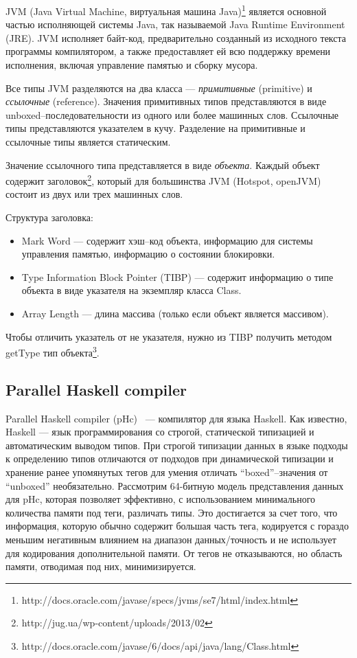 JVM (Java Virtual Machine, виртуальная машина Java)\footnote{http://docs.oracle.com/javase/specs/jvms/se7/html/index.html}
является основной частью исполняющей системы Java, так называемой Java Runtime Environment (JRE).
JVM исполняет байт-код, предварительно созданный из исходного текста программы компилятором, а также
предоставляет ей всю поддержку времени исполнения, включая управление памятью и сборку мусора.

Все типы JVM разделяются на два класса --- \emph{примитивные} (primitive) и \emph{ссылочные} (reference).
Значения примитивных типов представляются в виде unboxed--последовательности из одного или более машинных слов.
Ссылочные типы представляются указателем в кучу. Разделение на примитивные и ссылочные типы является статическим.

Значение ссылочного типа представляется в виде \emph{объекта}.
Каждый объект содержит заголовок\footnote{http://jug.ua/wp-content/uploads/2013/02}, который для 
большинства JVM (Hotspot, openJVM) состоит из двух или трех машинных слов.

Структура заголовка:

\begin{itemize}
\item Mark Word --- содержит хэш--код объекта, информацию для системы управления памятью, информацию о состоянии блокировки. 
\item Type Information Block Pointer (TIBP) --- содержит информацию о типе объекта в виде указателя на экземпляр класса Class.
\item Array Length --- длина массива (только если объект является массивом).
\end{itemize}            

Чтобы отличить указатель от не указателя, нужно из TIBP получить методом getType тип объекта\footnote{http://docs.oracle.com/javase/6/docs/api/java/lang/Class.html}.

\subsection {Parallel Haskell compiler}

Parallel Haskell compiler (pHc)~\cite{pHc} --- компилятор для языка Haskell.
Как известно, Haskell --- язык программирования со строгой, статической типизацией и автоматическим выводом типов.
При строгой типизации данных в языке подходы к определению типов отличаются от подходов при динамической типизации и 
хранение ранее упомянутых тегов для умения отличать ``boxed''--значения от ``unboxed'' необязательно.
Рассмотрим 64-битную модель представления данных для pHc, которая позволяет эффективно, с использованием минимального 
количества памяти под теги, различать типы. Это достигается за счет того, что информация, которую обычно содержит 
большая часть тега, кодируется с гораздо меньшим негативным влиянием на диапазон данных/точность и не использует 
для кодирования дополнительной памяти. От тегов не отказываются, но область памяти, отводимая под них, минимизируется.

